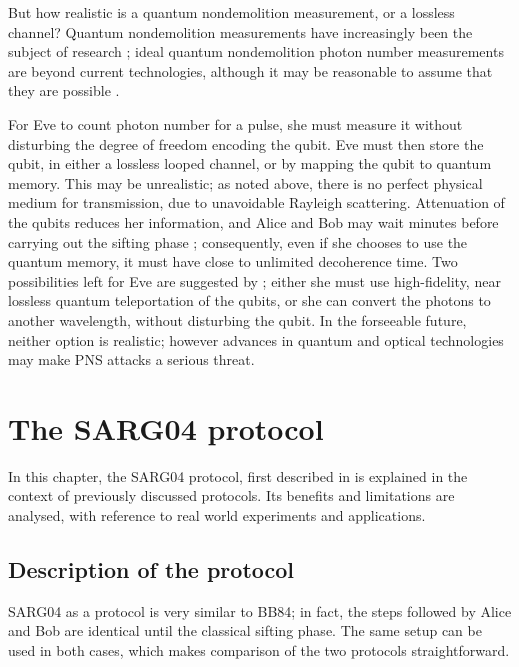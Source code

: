 \documentclass[paper=a4, fontsize=11pt]{scrartcl} %
\numberwithin{equation}{section} %
\numberwithin{figure}{section} %
\numberwithin{table}{section} %
\begin{document}
But how realistic is a quantum nondemolition measurement, or a lossless channel?
Quantum nondemolition measurements have increasingly been the subject of research \citep{brassard2000};
ideal quantum nondemolition photon number measurements are beyond current technologies, although it may
be reasonable to assume that they are possible \citep{reviewScariani, nogues1999}.

For Eve to count photon number for a pulse, she must measure it without disturbing the degree of
freedom encoding the qubit. Eve must then store the qubit, in either a lossless looped
channel, or by mapping the qubit to quantum memory. This may be unrealistic;
as noted above, there is no perfect physical medium
for transmission, due to unavoidable Rayleigh scattering.
Attenuation of the qubits reduces her information, and Alice and Bob
may wait minutes before carrying out the sifting phase \citep{reviewScariani}; consequently, even if she chooses to
use the quantum memory, it must have close to unlimited decoherence time. Two possibilities left for Eve are suggested
by \citet{gisin2002}; either she must use high-fidelity, near lossless quantum teleportation of the qubits, or
she can convert the photons to another wavelength, without disturbing the qubit. In the forseeable future,
neither option is realistic; however advances in quantum and optical technologies may make PNS attacks a serious threat.



\clearpage
\section{The SARG04 protocol}
In this chapter, the SARG04 protocol, first described in \citet{SARG04orig} is explained in the context of previously discussed protocols.
Its benefits and limitations are analysed, with reference to real world experiments and applications.

\subsection{Description of the protocol}
SARG04 as a protocol is very similar to BB84; in fact, the steps followed by Alice and Bob are identical until the classical sifting phase.
The same setup can be used in both cases, which makes comparison of the two protocols straightforward.
\end{document}
